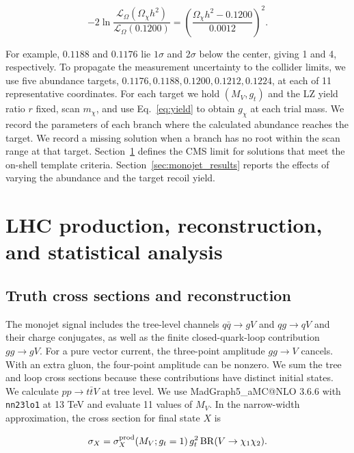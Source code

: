 \documentclass[aps,prd,reprint,superscriptaddress,longbibliography,floatfix]{revtex4-2}
\begin{document}
\begin{equation*}
-2\ln\frac{\mathcal L_\Omega(\Omega_\chi h^2)}{\mathcal L_\Omega(0.1200)}
=\left(\frac{\Omega_\chi h^2-0.1200}{0.0012}\right)^2.
\end{equation*}

For example, $0.1188$ and $0.1176$ lie $1\sigma$ and $2\sigma$ below the center, giving 1 and 4, respectively. To propagate the measurement uncertainty to the collider limits, we use five abundance targets, $0.1176,0.1188,0.1200,0.1212,0.1224$, at each of 11 representative coordinates. For each target we hold $(M_V,g_t)$ and the LZ yield ratio $r$ fixed, scan $m_\chi$, and use Eq.~\eqref{eq:yield} to obtain $g_\chi$ at each trial mass. We record the parameters of each branch where the calculated abundance reaches the target. We record a missing solution when a branch has no root within the scan range at that target. Section~\ref{sec:monojet_method} defines the CMS limit for solutions that meet the on-shell template criteria. Section~\ref{sec:monojet_results} reports the effects of varying the abundance and the target recoil yield.

\section{LHC production, reconstruction, and statistical analysis}
\label{sec:monojet_method}

\subsection{Truth cross sections and reconstruction}

The monojet signal includes the tree-level channels $q\bar q\to gV$ and $qg\to qV$ and their charge conjugates, as well as the finite closed-quark-loop contribution $gg\to gV$. For a pure vector current, the three-point amplitude $gg\to V$ cancels. With an extra gluon, the four-point amplitude can be nonzero. We sum the tree and loop cross sections because these contributions have distinct initial states. We calculate $pp\to t\bar tV$ at tree level. We use MadGraph5\_aMC@NLO 3.6.6 with \texttt{nn23lo1} at 13 TeV and evaluate 11 values of $M_V$. In the narrow-width approximation, the cross section for final state $X$ is

\begin{equation}
\label{eq:nwa}
\sigma_X=\sigma_X^{\rm prod}(M_V;g_t=1)\,g_t^2\,\mathrm{BR}(V\to\chi_1\chi_2).
\end{equation}
\end{document}
